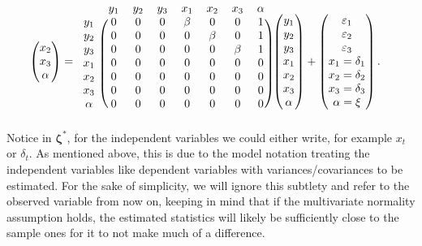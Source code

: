 \documentclass[]{interact}
\theoremstyle{plain}%
\theoremstyle{definition}
\theoremstyle{remark}
\begin{document}
\begin{align}
\begin{split}
\begin{pmatrix}
x_{2} \\
x_{3} \\
\alpha
\end{pmatrix} & = 
\begin{blockarray}{cccccccc}
 & y_{1} & y_{2} & y_{3} & x_{1} & x_{2} & x_{3} & \alpha \\
 \begin{block}{c(ccccccc)}
 y_{1}  & 0 & 0 & 0 & \beta & 0 & 0 & 1 \\
 y_{2}  & 0 & 0 & 0 & 0 & \beta & 0 & 1\\
 y_{3}  & 0 & 0 & 0 & 0 & 0 & \beta & 1 \\ 
 x_{1}  & 0 & 0 & 0 & 0 & 0 & 0 & 0 \\
 x_{2}  & 0 & 0 & 0 & 0 & 0 & 0 & 0 \\
 x_{3}  & 0 & 0 & 0 & 0 & 0 & 0 & 0 \\
 \alpha & 0 & 0 & 0 & 0 & 0 & 0 & 0 \\
 \end{block}
\end{blockarray}
\begin{pmatrix}
y_{1} \\
y_{2} \\
y_{3} \\
x_{1} \\
x_{2} \\
x_{3} \\
\alpha
\end{pmatrix} + 
\begin{pmatrix}
\varepsilon_{1} \\
\varepsilon_{2} \\
\varepsilon_{3} \\
x_{1} = \delta_{1} \\
x_{2} = \delta_{2} \\
x_{3} = \delta_{3} \\
\alpha = \xi \\
\end{pmatrix}. 
\end{split} \label{eq:eta}
\end{align} Notice in \(\bm{\zeta}^{*}\), for the independent variables
we could either write, for example \(x_{t}\) or \(\delta_{t}\). As
mentioned above, this is due to the model notation treating the
independent variables like dependent variables with
variances/covariances to be estimated. For the sake of simplicity, we
will ignore this subtlety and refer to the observed variable from now
on, keeping in mind that if the multivariate normality assumption holds,
the estimated statistics will likely be sufficiently close to the sample
ones for it to not make much of a difference.
\end{document}
